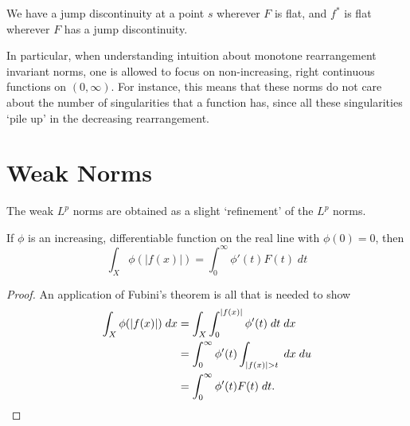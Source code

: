 \begin{remark}
    We have a jump discontinuity at a point $s$ wherever $F$ is flat, and $f^*$ is flat wherever $F$ has a jump discontinuity.
\end{remark}

In particular, when understanding intuition about monotone rearrangement invariant norms, one is allowed to focus on non-increasing, right continuous functions on $(0,\infty)$. For instance, this means that these norms do not care about the number of singularities that a function has, since all these singularities `pile up' in the decreasing rearrangement.

\section{Weak Norms}

The weak $L^p$ norms are obtained as a slight `refinement' of the $L^p$ norms.

\begin{theorem}
  If $\phi$ is an increasing, differentiable function on the real line with $\phi(0) = 0$, then
  \[ \int_X \phi(|f(x)|) = \int_0^\infty \phi'(t) F(t)\; dt \]
\end{theorem}
\begin{proof}
  An application of Fubini's theorem is all that is needed to show
  \begin{align*}
    \int_X \phi(|f(x)|)\; dx &= \int_X \int_0^{|f(x)|} \phi'(t)\; dt\; dx\\
    &= \int_0^\infty \phi'(t) \int_{|f(x)| > t}\; dx\; du\\
    &= \int_0^\infty \phi'(t) F(t)\; dt. \qedhere
  \end{align*}
\end{proof}


